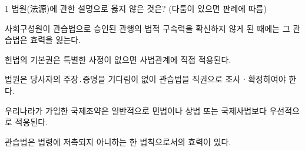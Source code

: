\begin{question}{1}
법원(法源)에 관한 설명으로 옳지 않은 것은? (다툼이 있으면 판례에 따름)
\begin{choices}
  \item 사회구성원이 관습법으로 승인된 관행의 법적 구속력을 확신하지 않게 된 때에는 그 관습법은 효력을 잃는다.
  \item 헌법의 기본권은 특별한 사정이 없으면 사법관계에 직접 적용된다.
  \item 법원은 당사자의 주장․증명을 기다림이 없이 관습법을 직권으로 조사ㆍ확정하여야 한다.
  \item 우리나라가 가입한 국제조약은 일반적으로 민법이나 상법 또는 국제사법보다 우선적으로 적용된다.
  \item 관습법은 법령에 저촉되지 아니하는 한 법칙으로서의 효력이 있다.
\end{choices}
\end{question}

